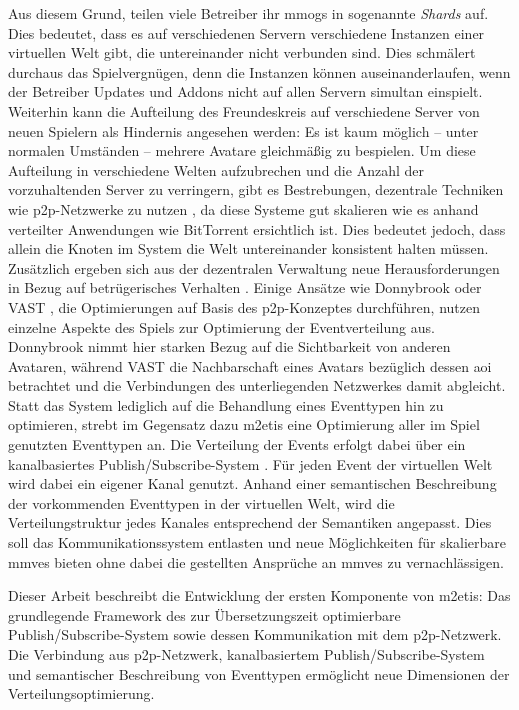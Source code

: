 Aus diesem Grund, teilen viele Betreiber ihr \acp{mmog} in sogenannte \emph{Shards} auf. Dies bedeutet, dass es auf verschiedenen Servern verschiedene Instanzen einer virtuellen Welt gibt, die untereinander nicht verbunden sind. Dies schmälert durchaus das Spielvergnügen, denn die Instanzen können auseinanderlaufen, wenn der Betreiber Updates und Addons nicht auf allen Servern simultan einspielt. Weiterhin kann die Aufteilung des Freundeskreis auf verschiedene Server von neuen Spielern als Hindernis angesehen werden: Es ist kaum möglich -- unter normalen Umständen -- mehrere Avatare gleichmäßig zu bespielen. Um diese Aufteilung in verschiedene Welten aufzubrechen und die Anzahl der vorzuhaltenden Server zu verringern, gibt es Bestrebungen, dezentrale Techniken wie \ac{p2p}-Netzwerke zu nutzen \cite{Knutsson2004Peertopeer, Triebel2008Peertopeer}, da diese Systeme gut skalieren wie es anhand verteilter Anwendungen wie BitTorrent ersichtlich ist. Dies bedeutet jedoch, dass allein die Knoten im System die Welt untereinander konsistent halten müssen. Zusätzlich ergeben sich aus der dezentralen Verwaltung neue Herausforderungen in Bezug auf betrügerisches Verhalten \cite{Kabus2007Design}. Einige Ansätze wie Donnybrook \cite{Bharambe2008Donnybrook} oder VAST \cite{Backhaus2007Voronoibased}, die Optimierungen auf Basis des \ac{p2p}-Konzeptes durchführen, nutzen einzelne Aspekte des Spiels zur Optimierung der Eventverteilung aus. Donnybrook nimmt hier starken Bezug auf die Sichtbarkeit von anderen Avataren, während VAST die Nachbarschaft eines Avatars bezüglich dessen \ac{aoi} betrachtet und die Verbindungen des unterliegenden Netzwerkes damit abgleicht. Statt das System lediglich auf die Behandlung eines Eventtypen hin zu optimieren, strebt im Gegensatz dazu \ac{m2etis} eine Optimierung aller im Spiel genutzten Eventtypen an. Die Verteilung der Events erfolgt dabei über ein kanalbasiertes Publish/Subscribe-System \cite{Fischer2010a}. Für jeden Event der virtuellen Welt wird dabei ein eigener Kanal genutzt. Anhand einer semantischen Beschreibung der vorkommenden Eventtypen in der virtuellen Welt, wird die Verteilungstruktur jedes Kanales entsprechend der Semantiken angepasst. Dies soll das Kommunikationssystem entlasten und neue Möglichkeiten für skalierbare \acp{mmve} bieten ohne dabei die gestellten Ansprüche an \acp{mmve} zu vernachlässigen.

Dieser Arbeit beschreibt die Entwicklung der ersten Komponente von \ac{m2etis}: Das grundlegende Framework des zur Übersetzungszeit optimierbare Publish/Subscribe-System sowie dessen Kommunikation mit dem \ac{p2p}-Netzwerk. Die Verbindung aus \ac{p2p}-Netzwerk, kanalbasiertem Publish/Subscribe-System und semantischer Beschreibung von Eventtypen ermöglicht neue Dimensionen der Verteilungsoptimierung.

